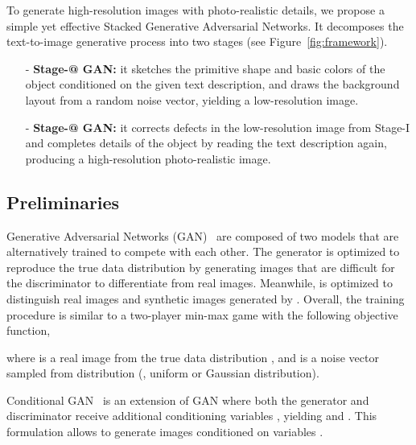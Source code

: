\documentclass[10pt,twocolumn,letterpaper]{article}
\makeatletter
\newcommand{\Rmnum}[1]{\expandafter\@slowromancap\romannumeral #1@}
\makeatother
\begin{document}
To generate high-resolution images with photo-realistic details, we propose a simple yet effective Stacked Generative Adversarial Networks. It decomposes the text-to-image generative process into two stages (see Figure~\ref{fig:framework}).  
\vspace{-5pt}
\begin{enumerate}
\item [-] \textbf{Stage-\Rmnum{1} GAN:} it sketches the primitive shape and basic colors of the object conditioned on the given text description, and draws the background layout from a random noise vector, yielding a low-resolution image. 
\vspace{-10pt}
\item [-] \textbf{Stage-\Rmnum{2} GAN:} it corrects defects in the low-resolution image from Stage-I and completes details of the object by reading the text description again, producing a high-resolution photo-realistic image. 
\end{enumerate}
\vspace{-5pt}

\subsection{Preliminaries}
\vspace{-5pt}
Generative Adversarial Networks (GAN)~\cite{goodfellow2014generative} are composed of two models that are alternatively trained to compete with each other. The generator  is optimized to reproduce the true data distribution  by generating images that are difficult for the discriminator  to differentiate from real images. Meanwhile,  is optimized to distinguish real images and synthetic images generated by . Overall, the training procedure is similar to a two-player min-max game with the following objective function, 

where  is a real image from the true data distribution , and  is a noise vector sampled from distribution  (\eg, uniform or Gaussian distribution). 

Conditional GAN~\cite{gauthier2015conditional, Mirza14} is an extension of GAN where both the generator and discriminator receive additional conditioning variables , yielding  and . This formulation allows  to generate images conditioned on variables . 
\end{document}
